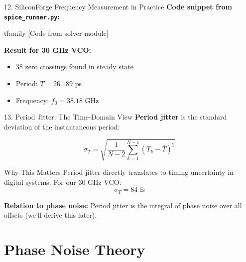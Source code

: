 \documentclass[aspectratio=169, 11pt]{beamer}
\begin{document}
\begin{frame}{12. SiliconForge Frequency Measurement in Practice}
    \textbf{Code snippet from \texttt{spice_runner.py}:}

    \vspace{0.5em}
    {	tfamily [Code from solver module]}

    \vspace{0.5em}
    \textbf{Result for 30 GHz VCO:}
    \begin{itemize}
        \item 38 zero crossings found in steady state
        \item Period: $T = 26.189$ ps
        \item Frequency: $f_0 = 38.18$ GHz
    \end{itemize}
\end{frame}

\begin{frame}{13. Period Jitter: The Time-Domain View}
    \textbf{Period jitter} is the standard deviation of the instantaneous period:

    \vspace{0.5em}
    \[ \sigma_T = \sqrt{\frac{1}{N-2}\sum_{k=1}^{N-1}(T_k - \bar{T})^2} \]

    \vspace{0.5em}
    \begin{block}{Why This Matters}
        Period jitter directly translates to timing uncertainty in digital systems. For our 30 GHz VCO:
        \[ \sigma_T = 84 \text{ fs} \]
    \end{block}

    \vspace{0.5em}
    \textbf{Relation to phase noise:}
    Period jitter is the integral of phase noise over all offsets (we'll derive this later).
\end{frame}


\section{Phase Noise Theory}
\end{document}
